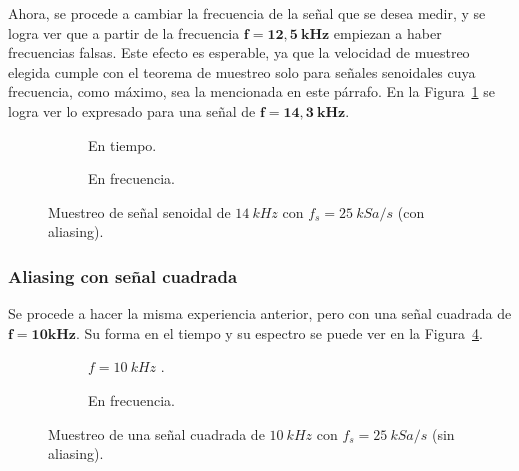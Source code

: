       Ahora, se procede a cambiar la frecuencia de la señal que se desea medir, y se logra ver que
      a partir de la frecuencia $\mathbf{f = 12,5~kHz}$ empiezan a haber frecuencias falsas. Este
      efecto es esperable, ya que la velocidad de muestreo elegida cumple con el teorema de muestreo
      solo para señales senoidales cuya frecuencia, como máximo, sea la mencionada en este párrafo. En
      la Figura~\ref{fig:Exp3SeñalConAlias} se logra ver lo expresado para una señal de $\mathbf{f=14,3~kHz}$.



      \begin{figure}[H]
        \centering
        \begin{subfigure}[H]{0.48\textwidth}
          \caption{En tiempo.}
        \end{subfigure}
        \hfill 
        \begin{subfigure}[H]{0.48\textwidth}
          \caption{En frecuencia.}
        \end{subfigure}

        \caption{Muestreo de señal senoidal de $14~kHz$ con $f_s=25~kSa/s$ (con aliasing).}
        \label{fig:Exp3SeñalConAlias}
      \end{figure}

      \subsubsection{Aliasing con señal cuadrada}
      Se procede a hacer la misma experiencia anterior, pero con una señal cuadrada de $\mathbf{f=10kHz}$.
      Su forma en el tiempo y su espectro se puede ver en la Figura~\ref{fig:Exp3SeñalCuad10k}.

      \begin{figure}[H]
        \centering
        \begin{subfigure}[H]{0.48\textwidth}
          \caption{$f=10~kHz$ .}
          \label{En tiempo.}
        \end{subfigure}
        \hfill 
        \begin{subfigure}[H]{0.44\textwidth}
          \caption{En frecuencia.}
          \label{fig:Exp3EspectroSeñalCuad}
        \end{subfigure}

        \caption{Muestreo de una señal cuadrada de $10~kHz$ con $f_s=25~kSa/s$ (sin aliasing).}
        \label{fig:Exp3SeñalCuad10k}
      \end{figure}

